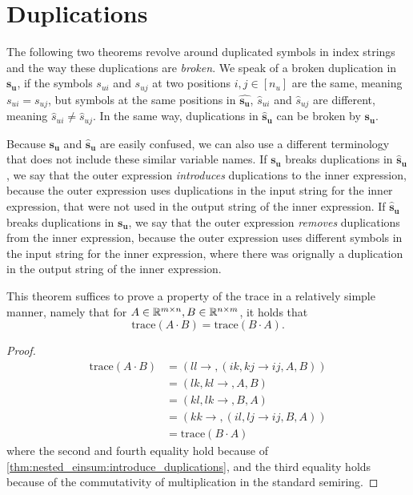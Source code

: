 \section{Duplications}

The following two theorems revolve around duplicated symbols in index strings and the way these duplications are \textit{broken}.
We speak of a broken duplication in $\bm{s_u}$, if the symbols $s_{ui}$ and $s_{uj}$ at two positions $i,j \in [n_u]$ are the same, meaning $s_{ui} = s_{uj}$,
but symbols at the same positions in $\bm{\hat{s_u}}$, $\hat{s}_{ui}$ and $\hat{s}_{uj}$ are different, meaning $\hat{s}_{ui} \neq \hat{s}_{uj}$.
In the same way, duplications in $\bm{\hat{s}_u}$ can be broken by $\bm{s_u}$.

Because $\bm{s_u}$ and $\bm{\hat{s}_u}$ are easily confused, we can also use a different terminology that does not include these similar variable names.
If $\bm{s_u}$ breaks duplications in $\bm{\hat{s}_u}$, we say that the outer expression \textit{introduces} duplications to the inner expression,
because the outer expression uses duplications in the input string for the inner expression, that were not used in the output string of the inner expression.
If $\bm{\hat{s}_u}$ breaks duplications in $\bm{s_u}$, we say that the outer expression \textit{removes} duplications from the inner expression,
because the outer expression uses different symbols in the input string for the inner expression, where there was orignally a duplication in the output string of the inner expression.



This theorem suffices to prove a property of the trace in a relatively simple manner, namely that for $A \in \mathbb{R}^{m \times n}, B \in \mathbb{R}^{n \times m}$,
it holds that
$$\text{trace}(A \cdot B) = \text{trace}(B \cdot A).$$

\begin{proof}
    \small
    \begin{align*}
        \text{trace}(A \cdot B) & = (ll \rightarrow , (ik,kj \rightarrow ij, A, B))  \\
                                & = (lk, kl \rightarrow ,A, B)                       \\
                                & = (kl, lk \rightarrow ,B, A)                       \\
                                & = (kk \rightarrow , (il, lj \rightarrow ij, B, A)) \\
                                & = \text{trace}(B \cdot A)
    \end{align*}
    where the second and fourth equality hold because of \cref{thm:nested_einsum:introduce_duplications},
    and the third equality holds because of the commutativity of multiplication in the standard semiring.
\end{proof}
\bigskip



